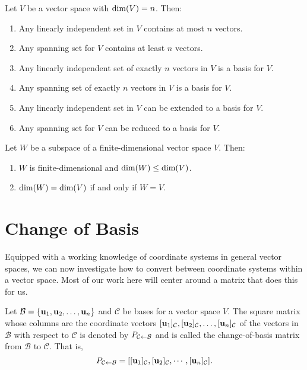 \documentclass[../m73main.tex]{subfiles}
\begin{document}
\begin{theorem}
	Let $V$ be a vector space with $\textrm{dim}(V) = n$.
	Then:
	\begin{enumerate}[label=(\alph*)]
		\item Any linearly independent set in $V$ contains at most $n$ vectors.
		\item Any spanning set for $V$ contains at least $n$ vectors.
		\item Any linearly independent set of exactly $n$ vectors in $V$ is a basis for $V$.
		\item Any spanning set of exactly $n$ vectors in $V$ is a basis for $V$.
		\item Any linearly independent set in $V$ can be extended to a basis for $V$.
		\item Any spanning set for $V$ can be reduced to a basis for $V$.
	\end{enumerate}
\end{theorem}

\begin{theorem}
	Let $W$ be a subspace of a finite-dimensional vector space $V$.
	Then:
	\begin{enumerate}[label=(\alph*)]
		\item $W$ is finite-dimensional and $\textrm{dim}(W) \leq \textrm{dim}(V)$.
		\item $\textrm{dim}(W) = \textrm{dim}(V)$ if and only if $W = V$.
	\end{enumerate}
\end{theorem}

\section{Change of Basis}
Equipped with a working knowledge of coordinate systems in general vector spaces, we can now investigate how to convert between coordinate systems within a vector space.
Most of our work here will center around a matrix that does this for us.

\begin{definition}
	Let $\mathcal{B} = \{\mathbf{u}_1, \mathbf{u}_2, \ldots, \mathbf{u}_n\}$ and $\mathcal{C}$ be bases for a vector space $V$.
	The square matrix whose columns are the coordinate vectors $[\mathbf{u}_1]_{\mathcal{C}}, [\mathbf{u}_2]_{\mathcal{C}}, \ldots, [\mathbf{u}_n]_{\mathcal{C}}$ of the vectors in $\mathcal{B}$ with respect to $\mathcal{C}$ is denoted by $P_{\mathcal{C} \leftarrow \mathcal{B}}$ and is called the change-of-basis matrix from $\mathcal{B}$ to $\mathcal{C}$.
	That is,
	\[ P_{\mathcal{C} \leftarrow \mathcal{B}} = [[\mathbf{u}_1]_{\mathcal{C}}, [\mathbf{u}_2]_{\mathcal{C}}, \cdots, [\mathbf{u}_n]_{\mathcal{C}}]. \]
\end{definition}
\end{document}
